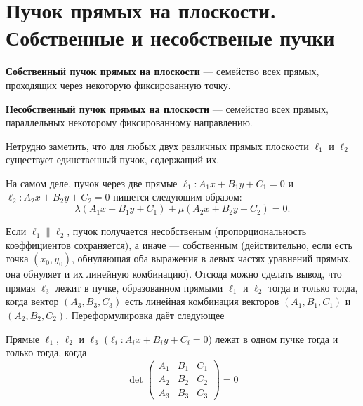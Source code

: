 \section{Пучок прямых на плоскости. Собственные и несобственые пучки}

\begin{definition}
    \textbf{Собственный пучок прямых на плоскости} --- семейство всех прямых, проходящих через некоторую фиксированную точку.
\end{definition}

\begin{definition}
    \textbf{Несобственный пучок прямых на плоскости} --- семейство всех прямых, параллельных некоторому фиксированному направлению.
\end{definition}

Нетрудно заметить, что для любых двух различных прямых плоскости $\ell_1$ и $\ell_2$ существует единственный пучок, содержащий их.

На самом деле, пучок через две прямые $\ell_1: A_1x + B_1y + C_1 = 0$ и $\ell_2: A_2x + B_2y + C_2 = 0$ пишется следующим образом:
$$\lambda(A_1x + B_1y + C_1) + \mu(A_2x + B_2y + C_2) = 0.$$

Если $\ell_1 \parallel \ell_2$, пучок получается несобственым (пропорциональность коэффициентов сохраняется), а иначе --- собственным (действительно, если есть точка $(x_0, y_0)$, обнуляющая оба выражения в левых частях уравнений прямых, она обнуляет и их линейную комбинацию). Отсюда можно сделать вывод, что прямая $\ell_3$ лежит в пучке, образованном прямыми $\ell_1$ и $\ell_2$ тогда и только тогда, когда вектор $(A_3, B_3, C_3)$ есть линейная комбинация векторов $(A_1, B_1, C_1)$ и $(A_2, B_2, C_2)$. Переформулировка даёт следующее

\begin{statement}
    Прямые $\ell_1$, $\ell_2$ и $\ell_3$ ($\ell_i: A_ix + B_iy + C_i = 0$) лежат в одном пучке тогда и только тогда, когда
    $$\det
    \begin{pmatrix}
        A_1 & B_1 & C_1\\
        A_2 & B_2 & C_2\\
        A_3 & B_3 & C_3
    \end{pmatrix} = 0
    $$
\end{statement}

